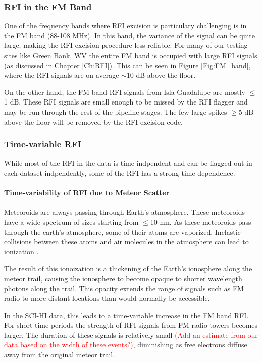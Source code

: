 \subsubsection{RFI in the FM Band}
One of the frequency bands where RFI excision is particulary challenging is in the FM band (88-108 MHz). In this band, the variance of the signal can be quite large; making the RFI excision procedure less reliable. For many of our testing sites like Green Bank, WV the entire FM band is occupied with large RFI signals (as discussed in Chapter \ref{Ch:RFI}). This can be seen in Figure \ref{Fig:FM_band}, where the RFI signals are on average $\sim$10 dB above the floor. 

On the other hand, the FM band RFI signals from Isla Guadalupe are mostly $\leq$1 dB. These RFI signals are small enough to be missed by the RFI flagger and may be run through the rest of the pipeline stages. The few large spikes $\geq$5 dB above the floor will be removed by the RFI excision code. 

\subsubsection{Time-variable RFI}
While most of the RFI in the data is time indpendent and can be flagged out in each dataset indpendently, some of the RFI has a strong time-dependence. 

\paragraph{Time-variability of RFI due to Meteor Scatter}
Meteoroids are always passing through Earth's atmosphere. These meteoroids have a wide spectrum of sizes starting from $\leq$10 nm. As these meteoroids pass through the earth's atmosphere, some of their atoms are vaporized. Inelastic collisions between these atoms and air molecules in the atmosphere can lead to ionization \cite{meteor_review}. 

The result of this ionoization is a thickening of the Earth's ionosphere along the meteor trail, causing the ionosphere to become opaque to shorter wavelength photons along the trail. This opacity extends the range of signals such as FM radio to more distant locations than would normally be accessible.

In the SCI-HI data, this leads to a time-variable increase in the FM band RFI. For short time periods the strength of RFI signals from FM radio towers becomes larger. The duration of these signals is relatively small \textcolor{red}{(Add an estimate from our data based on the width of these events?)}, diminishing as free electrons diffuse away from the original meteor trail. 

